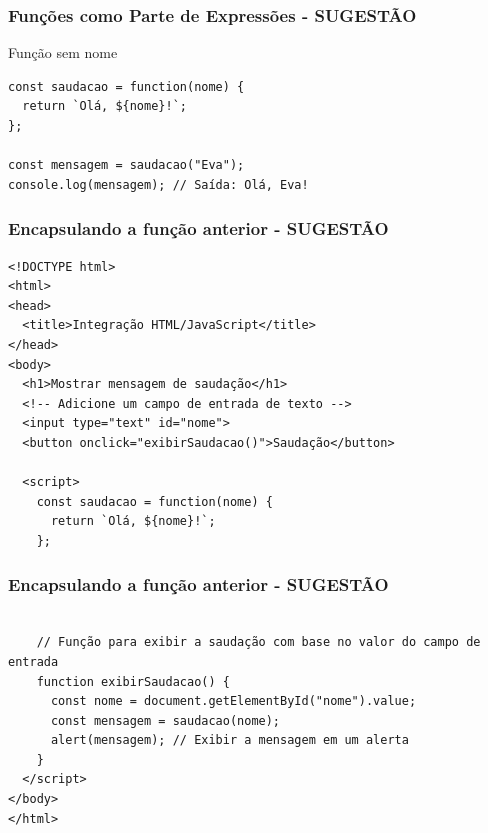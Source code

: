 \documentclass[13pt, xcolor={dvipsnames,svgnames}, portuguese]{beamer}
\begin{document}
\begin{frame}[fragile]
\frametitle{Funções como Parte de Expressões - SUGESTÃO}
Função sem nome
\begin{verbatim}
const saudacao = function(nome) {
  return `Olá, ${nome}!`;
};

const mensagem = saudacao("Eva");
console.log(mensagem); // Saída: Olá, Eva!
\end{verbatim}

\end{frame}

\begin{frame}[fragile]
\frametitle{Encapsulando a função anterior - SUGESTÃO}

\begin{verbatim}
<!DOCTYPE html>
<html>
<head>
  <title>Integração HTML/JavaScript</title>
</head>
<body>
  <h1>Mostrar mensagem de saudação</h1>
  <!-- Adicione um campo de entrada de texto -->
  <input type="text" id="nome">
  <button onclick="exibirSaudacao()">Saudação</button>

  <script>
    const saudacao = function(nome) {
      return `Olá, ${nome}!`;
    };
\end{verbatim}

\end{frame}
\begin{frame}[fragile]
\frametitle{Encapsulando a função anterior - SUGESTÃO}

\begin{verbatim}

    // Função para exibir a saudação com base no valor do campo de entrada
    function exibirSaudacao() {
      const nome = document.getElementById("nome").value;
      const mensagem = saudacao(nome);
      alert(mensagem); // Exibir a mensagem em um alerta
    }
  </script>
</body>
</html>
\end{verbatim}

\end{frame}
\end{document}

